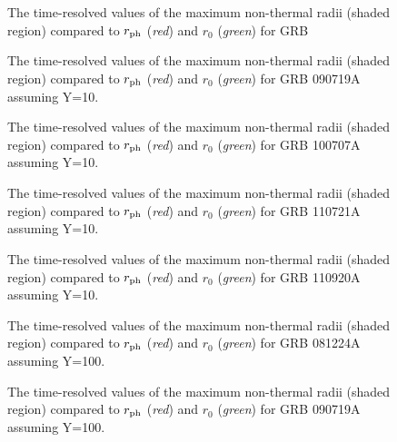 \newpage

\begin{figure}[tp]
  \centering
  \caption{The time-resolved values of the maximum non-thermal radii (shaded region) compared to $r_{\rm ph}$ (\emph{red}) and $r_{0}$ (\emph{green}) for GRB }
  \label{fig:RNT1}
\end{figure}


\begin{figure}[tp]
  \centering
  \caption{The time-resolved values of the maximum non-thermal radii (shaded region) compared to $r_{\rm ph}$ (\emph{red}) and $r_{0}$ (\emph{green}) for GRB 090719A assuming Y=10.}
  \label{fig:RNT2}
\end{figure}

\begin{figure}[tp]
  \centering
  \caption{The time-resolved values of the maximum non-thermal radii (shaded region) compared to $r_{\rm ph}$ (\emph{red}) and $r_{0}$ (\emph{green}) for GRB 100707A assuming Y=10.}
  \label{fig:RNT3}
\end{figure}


\begin{figure}[tp]
  \centering
  \caption{The time-resolved values of the maximum non-thermal radii (shaded region) compared to $r_{\rm ph}$ (\emph{red}) and $r_{0}$ (\emph{green}) for GRB 110721A assuming Y=10.}
  \label{fig:RNT4}
\end{figure}


\begin{figure}[tp]
  \centering
  \caption{The time-resolved values of the maximum non-thermal radii (shaded region) compared to $r_{\rm ph}$ (\emph{red}) and $r_{0}$ (\emph{green}) for GRB 110920A assuming Y=10.}
  \label{fig:RNT5}
\end{figure}

\newpage
\begin{figure}[tp]
  \centering
  \caption{The time-resolved values of the maximum non-thermal radii (shaded region) compared to $r_{\rm ph}$ (\emph{red}) and $r_{0}$ (\emph{green}) for GRB 081224A assuming Y=100.}
  \label{fig:RNT1}
\end{figure}


\begin{figure}[tp]
  \centering
  \caption{The time-resolved values of the maximum non-thermal radii (shaded region) compared to $r_{\rm ph}$ (\emph{red}) and $r_{0}$ (\emph{green}) for GRB 090719A assuming Y=100.}
  \label{fig:RNT2}
\end{figure}

